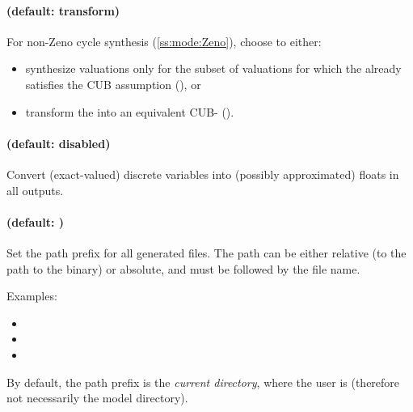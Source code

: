 \paragraph{ (default: transform)}
For non-Zeno cycle synthesis (\cref{ss:mode:Zeno}), choose to either:
\begin{itemize}
	\item synthesize valuations only for the subset of valuations for which the \NIPTA{} already satisfies the CUB assumption (), or
	\item transform the \NIPTA{} into an equivalent CUB-\NIPTA{} ().
\end{itemize}



\paragraph{ (default: disabled)}
Convert (exact-valued) discrete variables into (possibly approximated) floats in all outputs.


\paragraph{ (default: )}
Set the path prefix for all generated files.
The path can be either relative (to the path to the \stylePath{\binimitator{}} binary) or absolute, and must be followed by the file name.

Examples:
\begin{itemize}
	\item {}
	\item {}
	\item {}
\end{itemize}

By default, the path prefix is the \emph{current directory}, \ie{} where the user is (therefore not necessarily the model directory).









